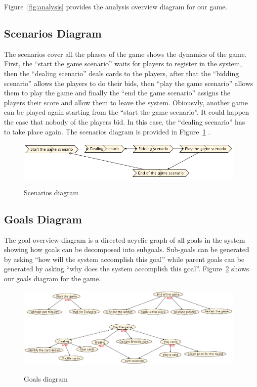 \documentclass[a4paper]{article}
\begin{document}
Figure~\ref{fig:analysis} provides the analysis overview diagram for our game.


\subsection{Scenarios Diagram}

The scenarios cover all the phases of the game shows the dynamics of the game. First, the ``start the game scenario'' waits for players to register in the system, then the ``dealing scenario'' deals cards to the players, after that the ``bidding scenario'' allows the players to do their bids, then ``play the game scenario'' allows them to play the game and finally the ``end the game scenario'' assigns the players their score and allow them to leave the system. Obiousvly, another game can be played again starting from the ``start the game scenario''. It could happen the case that nobody of the players bid. In this case, the ``dealing scenario'' has to take place again. The scenarios diagram is provided in Figure~\ref{fig:scenarios} .

\begin{figure}[htp]
  \centering
  \includegraphics[keepaspectratio,scale=0.5]{pdt/images/system_specification/scenarios.png}
  \label{fig:scenarios}
  \caption{Scenarios diagram}
\end{figure}

\subsection{Goals Diagram}

The goal overview diagram is a directed acyclic graph of all goals in the system showing how goals can be decomposed into subgoals. Sub-goals can be generated by asking ``how will the system accomplish this goal'' while parent goals can be generated by asking ``why does the system accomplish this goal''. Figure~\ref{fig:goals} shows our goals diagram for the game.

\begin{figure}[htp]
  \centering
  \includegraphics[keepaspectratio,scale=0.4]{pdt/images/system_specification/goal_overview.png}
  \label{fig:goals}
  \caption{Goals diagram}
\end{figure}
  
\end{document}
